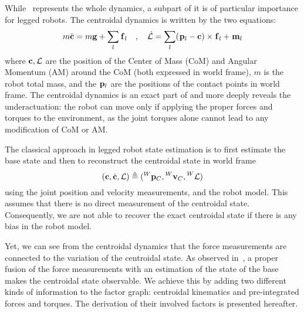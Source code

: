 While~ represents the whole dynamics, a subpart of it is of particular importance for legged robots.
The centroidal dynamics is written by the two equations:
%
\begin{equation}
    m \ddot{{\bf c}} = m {\bf g} + \sum_l \prescript{}{}{{\bf f}}_{l} \quad , \quad
\mathcal{\dot{L}} = \sum_l (\prescript{}{}{{\bf p}}_{l} - {\bf c}) \times \prescript{}{}{{\bf f}}_{l} + \prescript{}{}{\bf m}_{l}
\label{eq:NewtonEuler}
\end{equation}
%
where ${\bf c},\mathcal{L}$ are the position of the Center of Mass (CoM) and Angular Momentum (AM) around the CoM (both expressed in world frame), $m$ is the robot total mass, 
and the $\prescript{}{}{{\bf p}}_{l}$ are the positions of the contact points in world frame. The centroidal dynamics is an exact part of  and more deeply reveals 
the underactuation: the robot can move only if applying the proper forces and torques to the environment, as the joint torques alone cannot lead to any modification 
of CoM or AM.

The classical approach in legged robot state estimation is to first estimate the base state and then to reconstruct the centroidal state in world frame
%
\begin{equation}
    ({\bf c},\dot{{\bf c}},\mathcal{L}) \triangleq (\prescript{W}{}{{\bf p}}_{C},\prescript{W}{}{{\bf v}}_{C},\prescript{W}{}{\mathcal{L}})
\end{equation}
%
using the joint position and velocity measurements, and the robot model. This assumes that there is no direct measurement of the centroidal state.
Consequently, we are not able to recover the exact centroidal state if there is any bias in the robot model.

Yet, we can see from the centroidal dynamics that the force measurements are connected to the variation of the centroidal state.
As observed in~\cite{carpentier2016center}, a proper fusion of the force measurements with an estimation of the state of the base makes the centroidal state observable.
We achieve this by adding two different kinds of information to the factor graph: centroidal kinematics and pre-integrated forces and torques. The derivation of their involved factors is presented hereafter.


